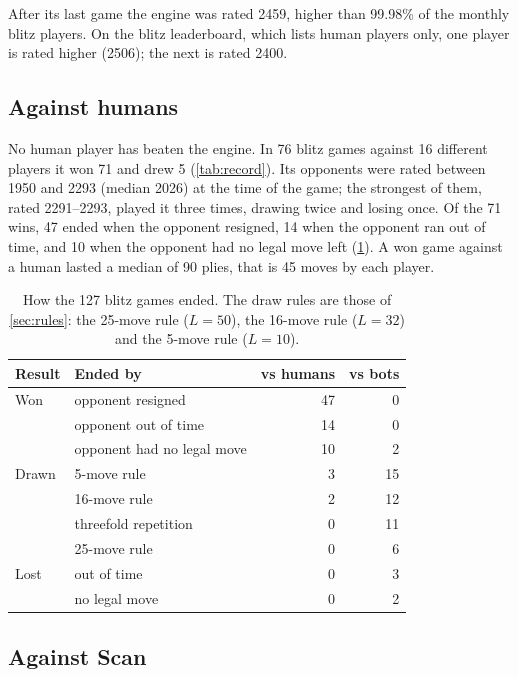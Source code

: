 After its last game the engine was rated 2459, higher than 99.98\% of the
monthly blitz players. On the blitz leaderboard, which lists human players only,
one player is rated higher (2506); the next is rated 2400.

\subsection{Against humans}\label{sec:res-humans}

No human player has beaten the engine. In 76 blitz games against 16 different
players it won 71 and drew 5 (\cref{tab:record}). Its opponents were rated
between 1950 and 2293 (median 2026) at the time of the game; the strongest of
them, rated 2291--2293, played it three times, drawing twice and losing once.
Of the 71 wins, 47 ended when the opponent resigned, 14 when the opponent ran out
of time, and 10 when the opponent had no legal move left (\cref{tab:endings}).
A won game against a human lasted a median of 90 plies, that is 45 moves by
each player.

\begin{table}[ht]
  \centering
  \caption{How the 127 blitz games ended. The draw rules are those of
  \cref{sec:rules}: the 25-move rule ($L=50$), the 16-move rule ($L=32$) and the
  5-move rule ($L=10$).}\label{tab:endings}
  \begin{tabular}{llrr}
    \toprule
    Result & Ended by & vs humans & vs bots \\
    \midrule
    Won   & opponent resigned          & 47 & 0 \\
          & opponent out of time       & 14 & 0 \\
          & opponent had no legal move & 10 & 2 \\
    \midrule
    Drawn & 5-move rule                &  3 & 15 \\
          & 16-move rule               &  2 & 12 \\
          & threefold repetition       &  0 & 11 \\
          & 25-move rule               &  0 &  6 \\
    \midrule
    Lost  & out of time                &  0 & 3 \\
          & no legal move              &  0 & 2 \\
    \bottomrule
  \end{tabular}
\end{table}

\subsection{Against Scan}\label{sec:res-scan}

